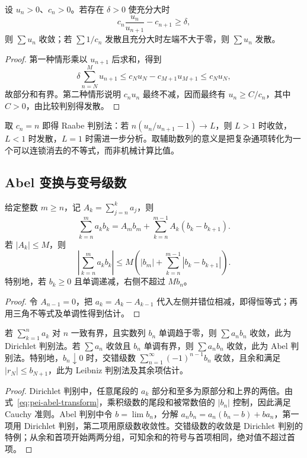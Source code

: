 \begin{proposition}
设 $u_n>0$、$c_n>0$。若存在 $\delta>0$ 使充分大时
\[
 c_n\frac{u_n}{u_{n+1}}-c_{n+1}\geq\delta,
\]
则 $\sum u_n$ 收敛；若 $\sum1/c_n$ 发散且充分大时左端不大于零，则 $\sum u_n$ 发散。
\end{proposition}
\begin{proof}
第一种情形乘以 $u_{n+1}$ 后求和，得到
\[
 \delta\sum_{n=N}^{M}u_{n+1}
 \leq c_Nu_N-c_{M+1}u_{M+1}\leq c_Nu_N,
\]
故部分和有界。第二种情形说明 $c_nu_n$ 最终不减，因而最终有 $u_n\geq C/c_n$，其中 $C>0$，由比较判别得发散。
\end{proof}

取 $c_n=n$ 即得 Raabe 判别法：若 $n(u_n/u_{n+1}-1)\to L$，则 $L>1$ 时收敛，$L<1$ 时发散，$L=1$ 时需进一步分析。取辅助数列的意义是把复杂通项转化为一个可以连锁消去的不等式，而非机械计算比值。

\subsection{Abel 变换与变号级数}

\begin{proposition}[Abel 变换]
\label{prop:pei-abel-transform}
给定整数 $m\geq n$，记 $A_k=\sum_{j=n}^{k}a_j$，则
\begin{equation}
 \sum_{k=n}^{m}a_kb_k
 =A_mb_m+\sum_{k=n}^{m-1}A_k(b_k-b_{k+1}).
 \label{eq:pei-abel-transform}
\end{equation}
若 $|A_k|\leq M$，则
\[
 \left|\sum_{k=n}^{m}a_kb_k\right|
 \leq M\left(|b_m|+\sum_{k=n}^{m-1}|b_k-b_{k+1}|\right).
\]
特别地，若 $b_k\geq0$ 且单调递减，右侧不超过 $Mb_n$。
\end{proposition}
\begin{proof}
令 $A_{n-1}=0$，把 $a_k=A_k-A_{k-1}$ 代入左侧并错位相减，即得恒等式；再用三角不等式及单调性得到估计。
\end{proof}

\begin{theorem}
\label{thm:pei-dirichlet-abel}
若 $\sum_{k=1}^{n}a_k$ 对 $n$ 一致有界，且实数列 $b_n$ 单调趋于零，则 $\sum a_nb_n$ 收敛，此为 Dirichlet 判别法。若 $\sum a_n$ 收敛且 $b_n$ 单调有界，则 $\sum a_nb_n$ 收敛，此为 Abel 判别法。特别地，$b_n\downarrow0$ 时，交错级数 $\sum_{n=1}^{\infty}(-1)^{n-1}b_n$ 收敛，且余和满足 $|r_N|\leq b_{N+1}$，此为 Leibniz 判别法及其余项估计。
\end{theorem}
\begin{proof}
Dirichlet 判别中，任意尾段的 $a_k$ 部分和至多为原部分和上界的两倍。由式~\eqref{eq:pei-abel-transform}，乘积级数的尾段和被常数倍的 $|b_n|$ 控制，因此满足 Cauchy 准则。Abel 判别中令 $b=\lim b_n$，分解 $a_nb_n=a_n(b_n-b)+ba_n$，第一项用 Dirichlet 判别，第二项用原级数收敛性。交错级数的收敛是 Dirichlet 判别的特例；从余和首项开始两两分组，可知余和的符号与首项相同，绝对值不超过首项。
\end{proof}

